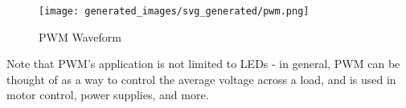 \documentclass[main.tex]{subfiles}
\begin{document}
\begin{figure}[H]
    \centering
    \texttt{[image: generated\_images/svg\_generated/pwm.png]}
    \caption{PWM Waveform}
    \label{fig:pwm_waveform}
\end{figure}

\noindent Note that PWM's application is not limited to LEDs - in general, PWM can be thought of as a way to control the average voltage across a load, and is used in motor control, power supplies, and more. 
\end{document}
